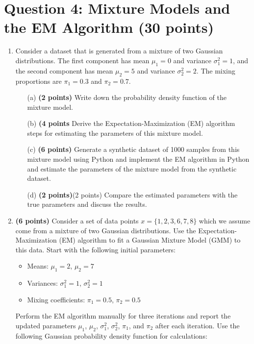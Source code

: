 \documentclass{article}
\begin{document}
\section*{Question 4: Mixture Models and the EM Algorithm (30 points)}

\begin{enumerate}
    \item Consider a dataset that is generated from a mixture of two Gaussian distributions. The first component has mean \(\mu_1 = 0\) and variance \(\sigma_1^2 = 1\), and the second component has mean \(\mu_2 = 5\) and variance \(\sigma_2^2 = 2\). The mixing proportions are \(\pi_1 = 0.3\) and \(\pi_2 = 0.7\).
    \begin{enumerate}
        \item[(a)] \textbf{(2 points)} Write down the probability density function of the mixture model.
        \item[(b)] \textbf{(4 points} Derive the Expectation-Maximization (EM) algorithm steps for estimating the parameters of this mixture model.
        \item[(c)] \textbf{(6 points)} Generate a synthetic dataset of 1000 samples from this mixture model using Python and implement the EM algorithm in Python and estimate the parameters of the mixture model from the synthetic dataset.
        \item[(d)] \textbf{(2 points)}(2 points) Compare the estimated parameters with the true parameters and discuss the results.
    \end{enumerate}
    
    \item \textbf{(6 points)} Consider a set of data points \(x = \{1, 2, 3, 6, 7, 8\}\) which we assume come from a mixture of two Gaussian distributions. Use the Expectation-Maximization (EM) algorithm to fit a Gaussian Mixture Model (GMM) to this data. Start with the following initial parameters:

    \begin{itemize}
        \item Means: \(\mu_1 = 2\), \(\mu_2 = 7\)
        \item Variances: \(\sigma_1^2 = 1\), \(\sigma_2^2 = 1\)
        \item Mixing coefficients: \(\pi_1 = 0.5\), \(\pi_2 = 0.5\)
    \end{itemize}

    Perform the EM algorithm manually for three iterations and report the updated parameters \(\mu_1\), \(\mu_2\), \(\sigma_1^2\), \(\sigma_2^2\), \(\pi_1\), and \(\pi_2\) after each iteration. Use the following Gaussian probability density function for calculations:
    

\end{enumerate}
\end{document}
